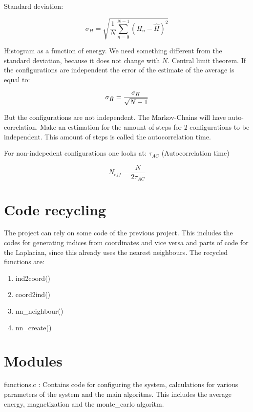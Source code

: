 \documentclass[11pt,a4paper]{article}
\begin{document}
Standard deviation:

\begin{equation}
    \sigma_{H} = \sqrt{\frac{1}{N} \sum_{n = 0}^{N-1 } (H_n - \hat{H})^2}
\end{equation}

Histogram as a function of energy. We need something different from the standard deviation, because it does not change with $N$. Central limit theorem. If the configurations are independent the error of the estimate of the average is equal to:

\begin{equation}
   \sigma_{\Bar{H}} = \frac{\sigma_H}{\sqrt{N-1}}
\end{equation}

But the configurations are not independent. The Markov-Chains will have auto-correlation. Make an estimation for the amount of steps for 2 configurations to be independent. This amount of steps is called the autocorrelation time.

For non-indepedent configurations one looks at: $\tau_{AC}$ (Autocorrelation time)

\begin{equation}
N_{eff} = \frac{N}{2 \tau_{AC}}
\end{equation}

\section{Code recycling}

The project can rely on some code of the previous project. This includes the codes for generating indices from coordinates and vice versa and parts of code for the Laplacian, since this already uses the nearest neighbours. The recycled functions are:
\begin{enumerate}
    \item ind2coord()
    \item coord2ind()
    \item nn\_neighbour()
    \item nn\_create()
\end{enumerate}

\section{Modules}

functions.c : Contains code for configuring the system, calculations for various parameters of the system and the main algoritms. This includes the average energy, magnetization and the monte\_carlo algoritm.
\end{document}
